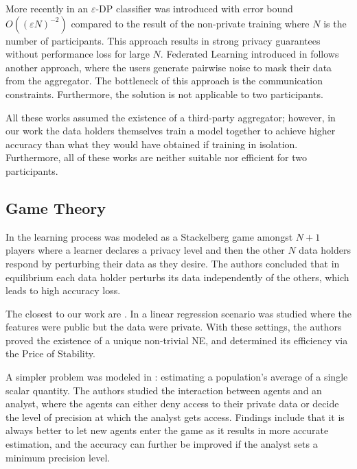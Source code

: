 \documentclass[USenglish,oneside,twocolumn]{article}
\theoremstyle{plain}
\begin{document}
    More recently in \cite{hamm2016learning} an $\varepsilon$-DP classifier was introduced with error bound $O((\varepsilon N)^{-2})$ compared to the result of the non-private training where $N$ is the number of participants. This approach results in strong privacy guarantees without performance loss for large $N$. Federated Learning introduced in \cite{mcmahan2016communication} follows another approach, where the users generate pairwise noise to mask their data from the aggregator. The bottleneck of this approach is the communication constraints. Furthermore, the solution is not applicable to two participants.
    
    All these works assumed the existence of a third-party aggregator; however, in our work the data holders themselves train a model together to achieve higher accuracy than what they would have obtained if training in isolation. Furthermore, all of these works are neither suitable nor efficient for two participants.
    
    \vspace{-0.5cm}
    \subsection{Game Theory}
    \vspace{-0.25cm}
    
    In \cite{pawlick2016stackelberg} the learning process was modeled as a Stackelberg game amongst $N+1$ players where a learner declares a privacy level and then the other $N$ data holders respond by perturbing their data as they desire. The authors concluded that in equilibrium each data holder perturbs its data independently of the others, which leads to high accuracy loss. 
    
    The closest to our work are \cite{ioannidis2013linear,chessa2015game,wu2017game}. In \cite{ioannidis2013linear} a linear regression scenario was studied where the features were public but the data were private. With these settings, the authors proved the existence of a unique non-trivial NE, and determined its efficiency via the Price of Stability.
    
    A simpler problem was modeled in \cite{chessa2015game}: estimating a population's average of a single scalar quantity. The authors studied the interaction between agents and an analyst, where the agents can either deny access to their private data or decide the level of precision at which the analyst gets access. Findings include that it is always better to let new agents enter the game as it results in more accurate estimation, and the accuracy can further be improved if the analyst sets a minimum precision level.
    
\end{document}

